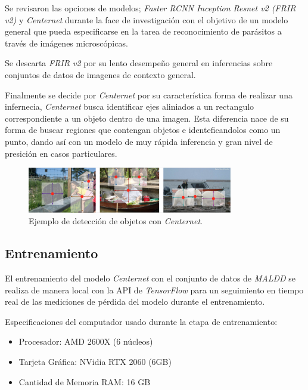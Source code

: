 \documentclass[letter,12pt]{report}
\begin{document}
Se revisaron las opciones de modelos; \textit{Faster RCNN Inception Resnet v2 (FRIR v2)} y
\textit{Centernet} durante la face de investigación con el objetivo de un modelo general que
pueda especificarse en la tarea de reconocimiento de parásitos a través de imágenes
microscópicas.

Se descarta \textit{FRIR v2} por su lento desempeño general en inferencias sobre conjuntos
de datos de imagenes de contexto general.

Finalmente se decide por \textit{Centernet} por su característica forma de realizar una
infernecia, \textit{Centernet} busca identificar ejes aliniados a un rectangulo
correspondiente a un objeto dentro de una imagen. Esta diferencia nace de su forma de 
buscar regiones que contengan objetos e identeficandolos como un punto, dando así con un
modelo de muy rápida inferencia y gran nivel de presición en casos particulares.

\begin{figure}[ht]
    \centering
    \includegraphics[width=0.8\textwidth]{centernet}
    \caption{Ejemplo de detección de objetos con \textit{Centernet}.}
    \label{fig:centernet}
\end{figure}

\subsection{Entrenamiento}
El entrenamiento del modelo \textit{Centernet} con el conjunto de datos de \textit{MALDD} se
realiza de manera local con la API de \textit{TensorFlow} para un seguimiento en tiempo real
de las mediciones de pérdida del modelo durante el entrenamiento.

Especificaciones del computador usado durante la etapa de entrenamiento:

\begin{itemize}
    \item Procesador: AMD 2600X (6 núcleos)
    \item Tarjeta Gráfica: NVidia RTX 2060 (6GB)
    \item Cantidad de Memoria RAM: 16 GB
\end{itemize}
\end{document}

